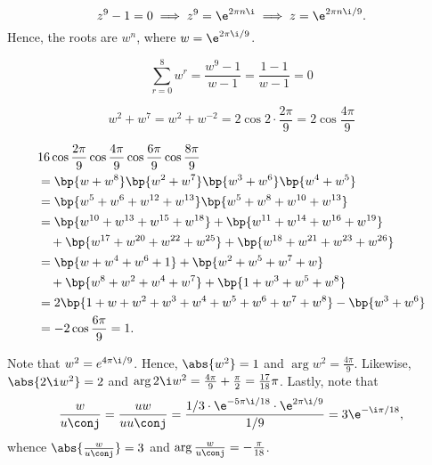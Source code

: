 \begin{solution}
    \begin{ppart}
        \begin{psubpart}
            \[z^9 - 1 = 0 \implies z^9 = \e^{2\pi n \i} \implies z = \e^{2\pi n \i/9}.\] Hence, the roots are $w^n$, where $w = \e^{2\pi \i/9}$.
        \end{psubpart}
        \begin{psubpart}
            \[\sum_{r=0}^8 w^r = \frac{w^9 - 1}{w -1} = \frac{1 - 1}{w - 1} = 0\]
        \end{psubpart}
        \begin{psubpart}
            \[w^2 + w^7 = w^2 + w^{-2} = 2\cos{2 \cdot \frac{2\pi}9} = 2\cos \frac{4\pi}9\]
        \end{psubpart}
        \begin{psubpart}
            \begin{align*}
                &16\cos\frac{2\pi}9 \cos\frac{4\pi}9 \cos\frac{6\pi}9 \cos\frac{8\pi}9\\
                &= \bp{w+w^8}\bp{w^2+w^7}\bp{w^3+w^6}\bp{w^4+w^5}\\
                &= \bp{w^5 + w^6 + w^{12} + w^{13}}\bp{w^5 + w^8 + w^{10} + w^{13}}\\
                &= \bp{w^{10} + w^{13} + w^{15} + w^{18}} + \bp{w^{11} + w^{14} + w^{16} + w^{19}}\\
                &\hspace{1em}+ \bp{w^{17} + w^{20} + w^{22} + w^{25}} + \bp{w^{18} + w^{21} + w^{23} + w^{26}}\\
                &= \bp{w + w^4 + w^6 + 1} + \bp{w^2 + w^5 + w^7 + w} \\
                &\hspace{1em}+ \bp{w^8 + w^2 + w^4 + w^7} + \bp{1 + w^3 + w^5 + w^8}\\
                &= 2\bp{1 + w + w^2 + w^3 + w^4 + w^5 + w^6 + w^7 + w^8} - \bp{w^3 + w^6}\\
                &= -2\cos \frac{6\pi}{9} = 1.
            \end{align*}
        \end{psubpart}
    \end{ppart}
    \begin{ppart}
        \begin{psubpart}
            Note that $w^2 = e^{4\pi \i/9}$. Hence, $\abs{w^2} = 1$ and $\arg w^2 = \frac{4\pi}9$. Likewise, $\abs{2\i w^2} = 2$ and $\arg{2\i w^2} = \frac{4\pi}9 + \frac\pi2 = \frac{17}{18}\pi$. Lastly, note that \[\frac{w}{u\conj} = \frac{uw}{uu\conj} = \frac{1/3 \cdot \e^{-5\pi \i/18} \cdot \e^{2\pi \i/9}}{1/9} = 3\e^{-\i\pi/18},\] whence $\abs{\frac{w}{u\conj}} = 3$ and $\arg{\frac{w}{u\conj}} = -\frac{\pi}{18}$.


\end{psubpart}
\end{ppart}
\end{solution}
